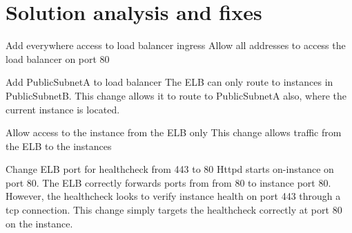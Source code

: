 \section{Solution analysis and fixes}

{Add everywhere access to load balancer ingress}
{
Allow all addresses to access the load balancer on port 80
}
{}

{Add PublicSubnetA to load balancer}
{
The ELB can only route to instances in PublicSubnetB. This change
allows it to route to PublicSubnetA also, where the current instance is located.
}
{}

{Allow access to the instance from the ELB only}
{This change allows traffic from the ELB to the instances}
{}


{Change ELB port for healthcheck from 443 to 80}
{
Httpd starts on-instance on port 80. The ELB correctly forwards ports
from from 80 to instance port 80.  However, the healthcheck looks to verify instance health on port 443 through a tcp connection. This change simply targets the healthcheck correctly at port 80 on the instance.
}
{}
